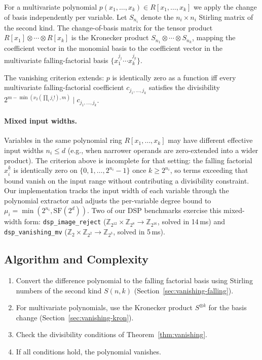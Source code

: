 \documentclass[runningheads]{llncs}
\begin{document}
For a multivariate polynomial $p(x_1, \ldots, x_k) \in R[x_1, \ldots, x_k]$
we apply the change of basis independently per variable. Let
$S_{n_i}$ denote the $n_i \times n_i$ Stirling matrix of the second
kind. The change-of-basis matrix for the tensor product
$R[x_1] \otimes \cdots \otimes R[x_k]$ is the Kronecker product
$S_{n_1} \otimes \cdots \otimes S_{n_k}$, mapping the coefficient
vector in the monomial basis to the coefficient vector in the
multivariate falling-factorial basis $\{x_1^{\underline{j_1}} \cdots
x_k^{\underline{j_k}}\}$.

The vanishing criterion extends: $p$ is identically zero as a
function iff every multivariate falling-factorial coefficient
$c_{j_1, \ldots, j_k}$ satisfies the divisibility
$2^{m - \min(\nu_2(\prod_i j_i!), m)} \mid c_{j_1, \ldots, j_k}$.

\paragraph{Mixed input widths.}
Variables in the same polynomial ring $R[x_1, \ldots, x_k]$ may have
different effective input widths $n_i \leq d$ (e.g., when narrower
operands are zero-extended into a wider product). The criterion
above is incomplete for that setting: the falling factorial
$x_i^{\underline{k}}$ is identically zero on
$\{0, 1, \ldots, 2^{n_i} - 1\}$ once $k \geq 2^{n_i}$, so terms
exceeding that bound vanish on the input range without contributing
a divisibility constraint. Our implementation tracks the input width
of each variable through the polynomial extractor and adjusts the
per-variable degree bound to $\mu_i = \min(2^{n_i}, \mathrm{SF}(2^d))$.
Two of our DSP benchmarks exercise this mixed-width form:
\texttt{dsp\_image\_reject}
($\mathbb{Z}_{2^{12}} \times \mathbb{Z}_{2^8} \to \mathbb{Z}_{2^{16}}$,
solved in 14\,ms) and \texttt{dsp\_vanishing\_mv}
($\mathbb{Z}_2 \times \mathbb{Z}_{2^2} \to \mathbb{Z}_{2^3}$,
solved in 5\,ms).

\subsection{Algorithm and Complexity}

\begin{enumerate}
\item Convert the difference polynomial to the falling factorial
  basis using Stirling numbers of the second kind $S(n,k)$
  (Section~\ref{sec:vanishing-falling}).
\item For multivariate polynomials, use the Kronecker product
  $S^{\otimes k}$ for the basis change (Section~\ref{sec:vanishing-kron}).
\item Check the divisibility conditions of Theorem~\ref{thm:vanishing}.
\item If all conditions hold, the polynomial vanishes.
\end{enumerate}
\end{document}
